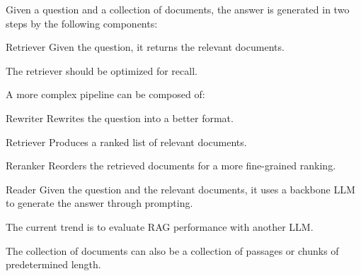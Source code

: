 \begin{description}
    \item[RAG for QA] 
        Given a question and a collection of documents, the answer is generated in two steps by the following components:
        \begin{descriptionlist}
            \item[Retriever] 
                Given the question, it returns the relevant documents.

                \begin{remark}
                    The retriever should be optimized for recall.
                \end{remark}

                \begin{remark}
                    A more complex pipeline can be composed of:
                    \begin{descriptionlist}
                        \item[Rewriter] Rewrites the question into a better format.
                        \item[Retriever] Produces a ranked list of relevant documents.
                        \item[Reranker] Reorders the retrieved documents for a more fine-grained ranking.
                    \end{descriptionlist}
                \end{remark}

            \item[Reader] 
                Given the question and the relevant documents, it uses a backbone LLM to generate the answer through prompting.
        \end{descriptionlist}
\end{description}

\begin{remark}
    The current trend is to evaluate RAG performance with another LLM.
\end{remark}

\begin{remark}
    The collection of documents can also be a collection of passages or chunks of predetermined length.
\end{remark}

